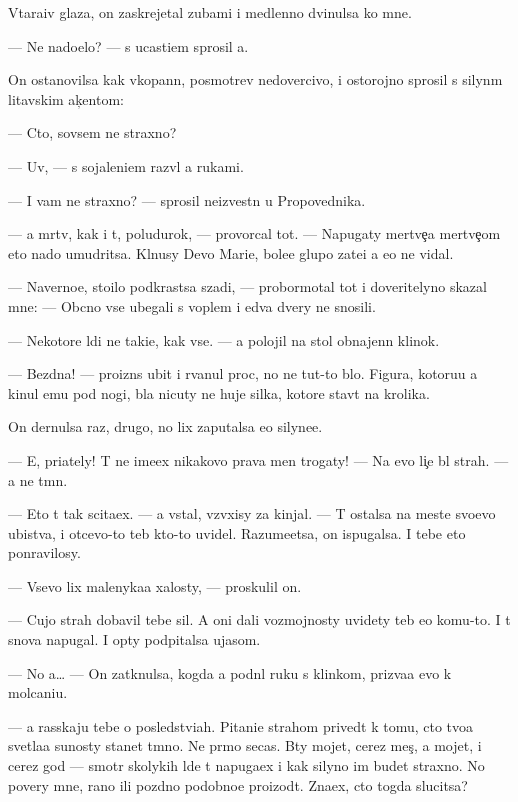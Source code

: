 \documentclass[10pt]{book}
\begin{document}
V{\yi}tara{\x}iv glaza, on zaskrejetal zubami i medlenno dvinulsa ko mne.

— Ne nado{\y}elo? — s ucasti{\y}em sprosil {\y}a.

On ostanovilsa kak vkopann{\yi}{\y}, posmotrev nedovercivo, i ostorojno sprosil s silyn{\yi}m litavskim ak{\c}entom:

— Cto, sovsem ne straxno?

— Uv{\yi}, — s sojaleni{\y}em razv{\e}l {\y}a rukami.

— I vam ne straxno? — sprosil ne{\y}izvestn{\yi}{\y} u Propovednika.

— {\Y}a m{\e}rtv, kak i t{\yi}, poludurok, — provorcal tot. — Napugaty mertve{\c}a mertve{\c}om eto nado umudritsa. Kl{\ia}nusy Devo{\y} Mari{\y}e{\y}, bole{\y}e glupo{\y} zate{\y}i {\y}a {\y}e{\x}o ne vidal.

— Naverno{\y}e, sto{\y}ilo podkrastsa szadi, — probormotal tot i doveritelyno skazal mne: — Ob{\yi}cno vse ubegali s voplem i {\y}edva dvery ne snosili.

— Nekotor{\yi}{\y}e l{\iu}di ne taki{\y}e, kak vse. — {\Y}a polojil na stol obnajenn{\yi}{\y} klinok.

— Bezdna! — proizn{\e}s ubit{\yi}{\y} i rvanul proc, no ne tut-to b{\yi}lo. Figura, kotoru{\y}u {\y}a kinul {\y}emu pod nogi, b{\yi}la nicuty ne huje silka, kotor{\yi}{\y}e stav{\ia}t na krolika.

On dernulsa raz, drugo{\y}, no lix zaputalsa {\y}e{\x}o silyne{\y}e.

— E{\y}, pri{\y}ately! T{\yi} ne ime{\y}ex nikakovo prava men{\ia} trogaty! — Na {\y}evo li{\c}e b{\yi}l strah. — {\Y}a ne t{\e}mn{\yi}{\y}.

— Eto t{\yi} tak scita{\y}ex. — {\Y}a vstal, vz{\ia}vxisy za kinjal. — T{\yi} ostalsa na meste svo{\y}evo ubi{\y}stva, i otcevo-to teb{\ia} kto-to uvidel. Razume{\y}etsa, on ispugalsa. I tebe eto ponravilosy.

— Vsevo lix malenyka{\y}a xalosty, — proskulil on.

— Cujo{\y} strah dobavil tebe sil. A oni dali vozmojnosty uvidety teb{\ia} {\y}e{\x}o komu-to. I t{\yi} snova napugal. I op{\ia}ty podpitalsa ujasom.

— No {\y}a… — On zatknulsa, kogda {\y}a podn{\ia}l ruku s klinkom, priz{\yi}va{\y}a {\y}evo k molcani{\y}u.

— {\Y}a rasskaju tebe o posledstvi{\y}ah. Pitani{\y}e strahom prived{\e}t k tomu, cto tvo{\y}a svetla{\y}a su{\x}nosty stanet t{\e}mno{\y}. Ne pr{\ia}mo se{\y}cas. B{\yi}ty mojet, cerez mes{\ia}{\c}, a mojet, i cerez god — smotr{\ia} skolykih l{\iu}de{\y} t{\yi} napuga{\y}ex i kak silyno im budet straxno. No povery mne, rano ili pozdno podobno{\y}e proizo{\y}d{\e}t. Zna{\y}ex, cto togda slucitsa?
\end{document}
